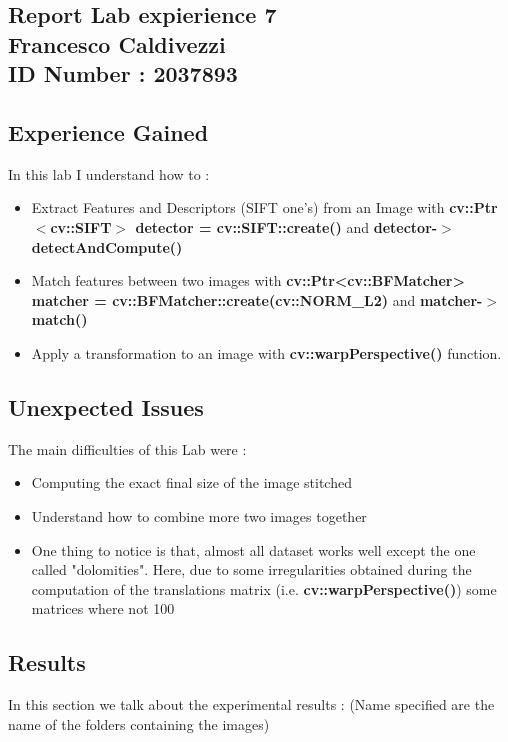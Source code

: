 \documentclass{article}
\begin{document}
\begin{flushleft}
\section*{Report Lab expierience 7\\ Francesco Caldivezzi \\ ID Number : 2037893}

\subsection*{Experience Gained}
In this lab I understand how to :
\begin{itemize}
  \item Extract Features and Descriptors (SIFT one's) from an Image with \textbf{cv::Ptr\(<\)cv::SIFT\(>\) detector = cv::SIFT::create()} and \textbf{detector-\(>\) detectAndCompute()}
  \item Match features between two images with \textbf{cv::Ptr<cv::BFMatcher> matcher = cv::BFMatcher::create(cv::NORM\_L2)} and \textbf{matcher-\(>\)match()}
  
  \item Apply a transformation to an image with \textbf{cv::warpPerspective()} function.
  
\end{itemize}

\newpage
\subsection*{Unexpected Issues}
The main difficulties of this Lab were :
\begin{itemize}
  \item Computing the exact final size of the image stitched
  \item Understand how to combine more two images together
  \item One thing to notice is that, almost all dataset works well except the one called "dolomities". Here, due to some irregularities obtained during the computation of the translations matrix (i.e. \textbf{cv::warpPerspective()}) some matrices where not 100%
\end{itemize}

\newpage
\subsection*{Results}
In this section we talk about the experimental results : (Name specified are the name of the folders containing the images)
\end{flushleft}
\end{document}
